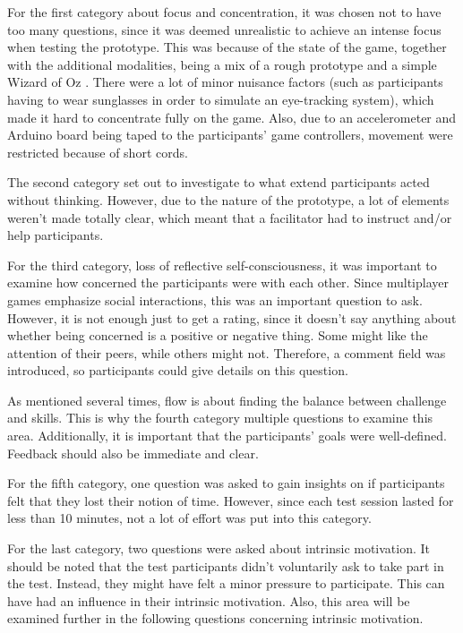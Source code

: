 For the first category about focus and concentration, it was chosen not to have too many questions, since it was deemed unrealistic to achieve an intense focus when testing the prototype. This was because of the state of the game, together with the additional modalities, being a mix of a rough prototype and a simple Wizard of Oz \citep{InteractDesign}. There were a lot of minor nuisance factors (such as participants having to wear sunglasses in order to simulate an eye-tracking system), which made it hard to concentrate fully on the game. Also, due to an accelerometer and Arduino board being taped to the participants' game controllers, movement were restricted because of short cords.

The second category set out to investigate to what extend participants acted without thinking. However, due to the nature of the prototype, a lot of elements weren't made totally clear, which meant that a facilitator had to instruct and/or help participants.

For the third category, loss of reflective self-consciousness, it was important to examine how concerned the participants were with each other. Since multiplayer games emphasize social interactions, this was an important question to ask. However, it is not enough just to get a rating, since it doesn't say anything about whether being concerned is a positive or negative thing. Some might like the attention of their peers, while others might not. Therefore, a comment field was introduced, so participants could give details on this question.

As mentioned several times, flow is about finding the balance between challenge and skills. This is why the fourth category multiple questions to examine this area. Additionally, it is important that the participants' goals were well-defined. Feedback should also be immediate and clear.

For the fifth category, one question was asked to gain insights on if participants felt that they lost their notion of time. However, since each test session lasted for less than 10 minutes, not a lot of effort was put into this category.

For the last category, two questions were asked about intrinsic motivation. It should be noted that the test participants didn't voluntarily ask to take part in the test. Instead, they might have felt a minor pressure to participate. This can have had an influence in their intrinsic motivation. Also, this area will be examined further in the following questions concerning intrinsic motivation.

